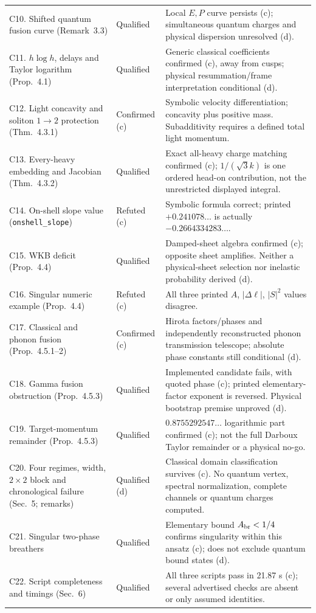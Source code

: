 \documentclass[11pt,a4paper]{article}
\begin{document}
\begin{longtable}{@{}L{5.6cm}L{2.4cm}L{7.2cm}@{}}
C10. Shifted quantum fusion curve (Remark~3.3) & Qualified & Local $E,P$ curve persists (c); simultaneous quantum charges and physical dispersion unresolved (d).\\
C11. $h\log h$, delays and Taylor logarithm (Prop.~4.1) & Qualified & Generic classical coefficients confirmed (c), away from cusps; physical resummation/frame interpretation conditional (d).\\
C12. Light concavity and soliton $1\to2$ protection (Thm.~4.3.1) & Confirmed (c) & Symbolic velocity differentiation; concavity plus positive mass. Subadditivity requires a defined total light momentum.\\
C13. Every-heavy embedding and Jacobian (Thm.~4.3.2) & Qualified & Exact all-heavy charge matching confirmed (c); $1/(\sqrt3 k)$ is one ordered head-on contribution, not the unrestricted displayed integral.\\
C14. On-shell slope value (\texttt{onshell\_slope}) & Refuted (c) & Symbolic formula correct; printed $+0.241078\ldots$ is actually $-0.2664334283\ldots$.\\
C15. WKB deficit (Prop.~4.4) & Qualified & Damped-sheet algebra confirmed (c); opposite sheet amplifies. Neither a physical-sheet selection nor inelastic probability derived (d).\\
C16. Singular numeric example (Prop.~4.4) & Refuted (c) & All three printed $A$, $|\Delta\ell|$, $|S|^2$ values disagree.\\
C17. Classical and phonon fusion (Prop.~4.5.1--2) & Confirmed (c) & Hirota factors/phases and independently reconstructed phonon transmission telescope; absolute phase constants still conditional (d).\\
C18. Gamma fusion obstruction (Prop.~4.5.3) & Qualified & Implemented candidate fails, with quoted phase (c); printed elementary-factor exponent is reversed. Physical bootstrap premise unproved (d).\\
C19. Target-momentum remainder (Prop.~4.5.3) & Qualified & $0.8755292547\ldots$ logarithmic part confirmed (c); not the full Darboux Taylor remainder or a physical no-go.\\
C20. Four regimes, width, $2\times2$ block and chronological failure (Sec.~5; remarks) & Qualified (d) & Classical domain classification survives (c). No quantum vertex, spectral normalization, complete channels or quantum charges computed.\\
C21. Singular two-phase breathers & Qualified & Elementary bound $A_{\rm br}<1/4$ confirms singularity within this ansatz (c); does not exclude quantum bound states (d).\\
C22. Script completeness and timings (Sec.~6) & Qualified & All three scripts pass in 21.87 s (c); several advertised checks are absent or only assumed identities.\\
\bottomrule
\end{longtable}
\normalsize
\end{document}
